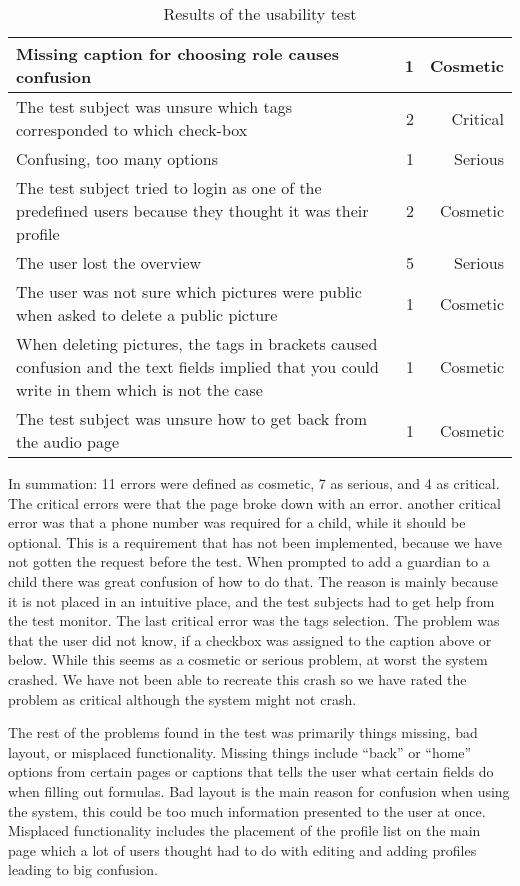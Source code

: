 \begin{table}[H]
\begin{tabular}{|p{7cm}|r|r|}
		Missing caption for choosing role causes confusion & 1 & Cosmetic \\ \hline
		The test subject was unsure which tags corresponded to which check-box & 2 & Critical \\ \hline
		Confusing, too many options & 1 & Serious \\ \hline
		The test subject tried to login as one of the predefined users because they thought it was their profile & 2 & Cosmetic \\ \hline
		The user lost the overview & 5 & Serious \\ \hline
		The user was not sure which pictures were public when asked to delete a public picture & 1 & Cosmetic \\ \hline
		When deleting pictures, the tags in brackets caused confusion and the text fields implied that you could write in them which is not the case & 1 & Cosmetic \\ \hline
		The test subject was unsure how to get back from the audio page & 1 & Cosmetic \\
		\hline
	\end{tabular}
	\caption{Results of the usability test}
	\label{tab:results}
\end{table}

In summation: 11 errors were defined as cosmetic, 7 as serious, and 4 as critical. \\

The critical errors were that the page broke down with an error. another critical error was that a phone number was required for a child, while it should be optional.
This is a requirement that has not been implemented, because we have not gotten the request before the test.
When prompted to add a guardian to a child there was great confusion of how to do that.
The reason is mainly because it is not placed in an intuitive place, and the test subjects had to get help from the test monitor.
The last critical error was the tags selection. The problem was that the user did not know, if a checkbox was assigned to the caption above or below. While this seems as a cosmetic or serious problem, at worst the system crashed. We have not been able to recreate this crash so we have rated the problem as critical although the system might not crash.

The rest of the problems found in the test was primarily things missing, bad layout, or misplaced functionality.
Missing things include ``back'' or ``home'' options from certain pages or captions that tells the user what certain fields do when filling out formulas. Bad layout is the main reason for confusion when using the system, this could be too much information presented to the user at once.
Misplaced functionality includes the placement of the profile list on the main page which a lot of users thought had to do with editing and adding profiles leading to big confusion. 